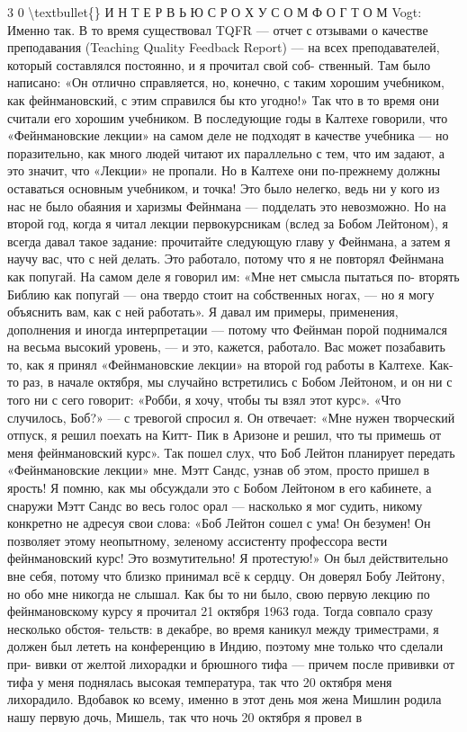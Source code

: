 \documentclass[10pt,oneside]{article}
\begin{document}
3 0 \textbackslash{}textbullet\{\} И Н Т Е Р В Ь Ю  С  Р О Х У С О М  Ф О Г Т О М Vogt: Именно так. В то время существовал TQFR --- отчет с отзывами о качестве преподавания (Teaching Quality Feedback Report) --- на всех преподавателей, который составлялся постоянно, и я прочитал свой соб- ственный. Там было написано: «Он отлично справляется, но, конечно, с таким хорошим учебником, как фейнмановский, с этим справился бы кто угодно!» Так что в то время они считали его хорошим учебником. В последующие годы в Калтехе говорили, что «Фейнмановские лекции» на самом деле не подходят в качестве учебника --- но поразительно, как много людей читают их параллельно с тем, что им задают, а это значит, что «Лекции» не пропали. Но в Калтехе они по-прежнему должны оставаться основным учебником, и точка! Это было нелегко, ведь ни у кого из нас не было обаяния и харизмы Фейнмана --- подделать это невозможно. Но на второй год, когда я читал лекции первокурсникам (вслед за Бобом Лейтоном), я всегда давал такое задание: прочитайте следующую главу у Фейнмана, а затем я научу вас, что с ней делать. Это работало, потому что я не повторял Фейнмана как попугай. На самом деле я говорил им: «Мне нет смысла пытаться по- вторять Библию как попугай --- она твердо стоит на собственных ногах, --- но я могу объяснить вам, как с ней работать». Я давал им примеры, применения, дополнения и иногда интерпретации --- потому что Фейнман порой поднимался на весьма высокий уровень, --- и это, кажется, работало. Вас может позабавить то, как я принял «Фейнмановские лекции» на второй год работы в Калтехе. Как-то раз, в начале октября, мы случайно встретились с Бобом Лейтоном, и он ни с того ни с сего говорит: «Робби, я хочу, чтобы ты взял этот курс». «Что случилось, Боб?» --- с тревогой спросил я. Он отвечает: «Мне нужен творческий отпуск, я решил поехать на Китт- Пик в Аризоне и решил, что ты примешь от меня фейнмановский курс». Так пошел слух, что Боб Лейтон планирует передать «Фейнмановские лекции» мне. Мэтт Сандс, узнав об этом, просто пришел в ярость! Я помню, как мы обсуждали это с Бобом Лейтоном в его кабинете, а снаружи Мэтт Сандс во весь голос орал --- насколько я мог судить, никому конкретно не адресуя свои слова: «Боб Лейтон сошел с ума! Он безумен! Он позволяет этому неопытному, зеленому ассистенту профессора вести фейнмановский курс! Это возмутительно! Я протестую!» Он был действительно вне себя, потому что близко принимал всё к сердцу. Он доверял Бобу Лейтону, но обо мне никогда не слышал. Как бы то ни было, свою первую лекцию по фейнмановскому курсу я прочитал 21 октября 1963 года. Тогда совпало сразу несколько обстоя- тельств: в декабре, во время каникул между триместрами, я должен был лететь на конференцию в Индию, поэтому мне только что сделали при- вивки от желтой лихорадки и брюшного тифа --- причем после прививки от тифа у меня поднялась высокая температура, так что 20 октября меня лихорадило. Вдобавок ко всему, именно в этот день моя жена Мишлин родила нашу первую дочь, Мишель, так что ночь 20 октября я провел в\par
\end{document}
